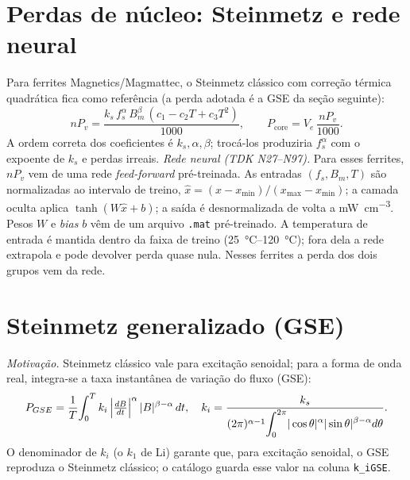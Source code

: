 \documentclass[
	a4paper, 12pt,
	chapter=TITLE, section=Title, subsection=Title,
	oneside, english, brazil, fleqn
]{abntex2}
\begin{document}
\section{Perdas de núcleo: Steinmetz e rede neural}
Para ferrites Magnetics/Magmattec, o Steinmetz clássico com correção térmica
quadrática fica como referência (a perda adotada é a GSE da seção seguinte):
\begin{equation}
	nP_v=\frac{k_s\,f_s^{\alpha}\,B_m^{\beta}\,(c_1-c_2 T+c_3 T^{2})}{1000},\qquad
	P_{\mathrm{core}}=V_e\,\frac{nP_v}{1000}.
	\label{eq:steintraf}
\end{equation}
A ordem correta dos coeficientes é $k_s,\alpha,\beta$; trocá-los produziria
$f_s^{\alpha}$ com o expoente de $k_s$ e perdas irreais.
\textit{Rede neural (TDK N27--N97).} Para esses ferrites, $nP_v$ vem de uma rede
\emph{feed-forward} pré-treinada. As entradas $(f_s,B_m,T)$ são normalizadas ao
intervalo de treino, $\hat x=(x-x_{\min})/(x_{\max}-x_{\min})$; a camada oculta
aplica $\tanh(W\hat x+b)$; a saída é desnormalizada de volta a
\si{\milli\watt\per\cubic\centi\meter}. Pesos $W$ e \emph{bias} $b$ vêm de um
arquivo \texttt{.mat} pré-treinado. A temperatura de entrada é mantida dentro da
faixa de treino (\SIrange{25}{120}{\degreeCelsius}); fora dela a rede extrapola e
pode devolver perda quase nula. Nesses ferrites a perda dos dois grupos vem da
rede.

\section{Steinmetz generalizado (GSE)}
\textit{Motivação.} Steinmetz clássico vale para excitação senoidal; para a forma
de onda real, integra-se a taxa instantânea de variação do fluxo (GSE):
\begin{equation}
	P_{GSE}=\frac{1}{T}\!\int_0^{T} k_i\,\Bigl|\tfrac{dB}{dt}\Bigr|^{\alpha}\,|B|^{\beta-\alpha}\,dt,
	\quad
	k_i=\frac{k_s}{(2\pi)^{\alpha-1}\!\displaystyle\int_0^{2\pi}\!|\cos\theta|^{\alpha}|\sin\theta|^{\beta-\alpha}d\theta}.
	\label{eq:gse}
\end{equation}
O denominador de $k_i$ (o $k_1$ de Li) garante que, para excitação senoidal, o GSE
reproduza o Steinmetz clássico; o catálogo guarda esse valor na coluna
\texttt{k\_iGSE}.
\end{document}
